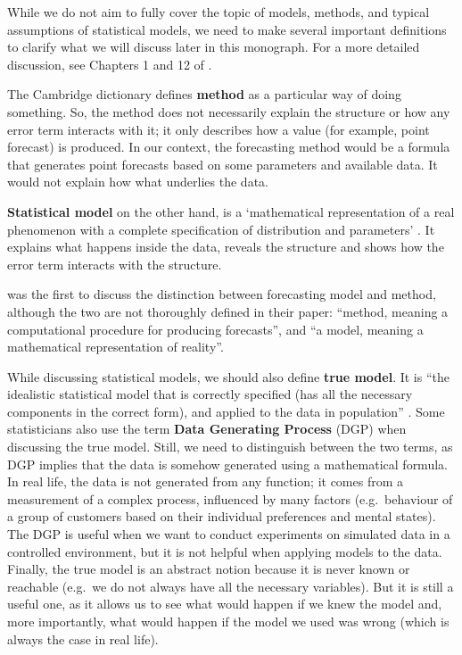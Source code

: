 \documentclass[
]{book}
\theoremstyle{definition}
\theoremstyle{definition}
\theoremstyle{definition}
\theoremstyle{definition}
\theoremstyle{remark}
\begin{document}
While we do not aim to fully cover the topic of models, methods, and typical assumptions of statistical models, we need to make several important definitions to clarify what we will discuss later in this monograph. For a more detailed discussion, see Chapters 1 and 12 of \citet{SvetunkovSBA}.

The Cambridge dictionary \citep{CambridgeMethod} defines \textbf{method} as a particular way of doing something. So, the method does not necessarily explain the structure or how any error term interacts with it; it only describes how a value (for example, point forecast) is produced. In our context, the forecasting method would be a formula that generates point forecasts based on some parameters and available data. It would not explain how what underlies the data.

\textbf{Statistical model} on the other hand, is a `mathematical representation of a real phenomenon with a complete specification of distribution and parameters' \citep{Svetunkov2019a}. It explains what happens inside the data, reveals the structure and shows how the error term interacts with the structure.

\citet{Chatfield2001} was the first to discuss the distinction between forecasting model and method, although the two are not thoroughly defined in their paper: ``method, meaning a computational procedure for producing forecasts'', and ``a model, meaning a mathematical representation of reality''.

While discussing statistical models, we should also define \textbf{true model}. It is ``the idealistic statistical model that is correctly specified (has all the necessary components in the correct form), and applied to the data in population'' \citep{SvetunkovSBA}. Some statisticians also use the term \textbf{Data Generating Process} (DGP) when discussing the true model. Still, we need to distinguish between the two terms, as DGP implies that the data is somehow generated using a mathematical formula. In real life, the data is not generated from any function; it comes from a measurement of a complex process, influenced by many factors (e.g.~behaviour of a group of customers based on their individual preferences and mental states). The DGP is useful when we want to conduct experiments on simulated data in a controlled environment, but it is not helpful when applying models to the data. Finally, the true model is an abstract notion because it is never known or reachable (e.g.~we do not always have all the necessary variables). But it is still a useful one, as it allows us to see what would happen if we knew the model and, more importantly, what would happen if the model we used was wrong (which is always the case in real life).
\end{document}
